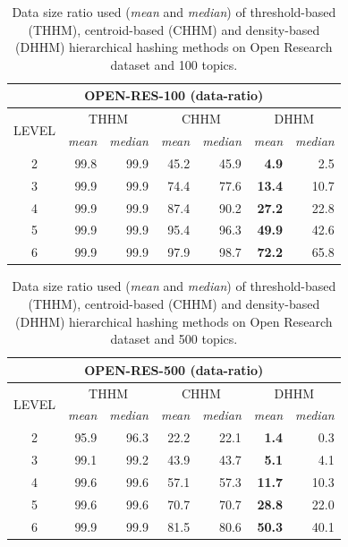 \begin{table}\centering
  \scriptsize
  \begin{tabular}{c|rr||rr||rr}
    \multicolumn{7}{c}{OPEN-RES-100 (data-ratio)} \\
    \toprule
    \multirow{2}{*}{LEVEL} &
      \multicolumn{2}{c}{THHM} &
      \multicolumn{2}{c}{CHHM} &
      \multicolumn{2}{c}{DHHM} \\
      & {\textit{mean}} & {\textit{median}} & {\textit{mean}} & {\textit{median}} & {\textit{mean}} & {\textit{median}} \\
      \midrule
    2 & 99.8 & 99.9 & 45.2 & 45.9 & \textbf{4.9} & 2.5 \\
    3 & 99.9 & 99.9 & 74.4 & 77.6 & \textbf{13.4} & 10.7 \\
    4 & 99.9 & 99.9 & 87.4 & 90.2 & \textbf{27.2} & 22.8 \\
    5 & 99.9 & 99.9 & 95.4 & 96.3 & \textbf{49.9} & 42.6 \\
    6 & 99.9 & 99.9 & 97.9 & 98.7 & \textbf{72.2} & 65.8 \\
    \bottomrule
  \end{tabular}
\caption{Data size ratio used (\textit{mean} and \textit{median}) of threshold-based (THHM), centroid-based (CHHM) and density-based (DHHM) hierarchical hashing methods on Open Research dataset and 100 topics.}
\label{tb:or100-d}
\end{table}

\begin{table}\centering
  \scriptsize
  \begin{tabular}{c|rr||rr||rr}
    \multicolumn{7}{c}{OPEN-RES-500 (data-ratio)} \\
    \toprule
    \multirow{2}{*}{LEVEL} &
      \multicolumn{2}{c}{THHM} &
      \multicolumn{2}{c}{CHHM} &
      \multicolumn{2}{c}{DHHM} \\
      & {\textit{mean}} & {\textit{median}} & {\textit{mean}} & {\textit{median}} & {\textit{mean}} & {\textit{median}} \\
      \midrule
    2 & 95.9 & 96.3 & 22.2 & 22.1 & \textbf{1.4} & 0.3 \\
    3 & 99.1 & 99.2 & 43.9 & 43.7 & \textbf{5.1} & 4.1 \\
    4 & 99.6 & 99.6 & 57.1 & 57.3 & \textbf{11.7} & 10.3 \\
    5 & 99.6 & 99.6 & 70.7 & 70.7 & \textbf{28.8} & 22.0 \\
    6 & 99.9 & 99.9 & 81.5 & 80.6 & \textbf{50.3} & 40.1 \\
    \bottomrule
  \end{tabular}
\caption{Data size ratio used (\textit{mean} and \textit{median}) of threshold-based (THHM), centroid-based (CHHM) and density-based (DHHM) hierarchical hashing methods on Open Research dataset and 500 topics.}
\label{tb:or500-d}
\end{table}

